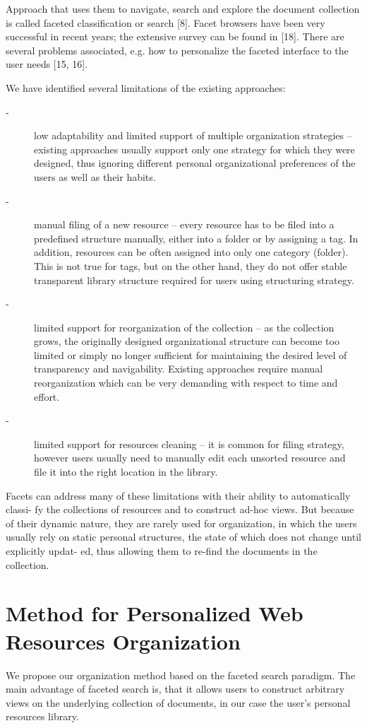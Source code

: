 \documentclass{llncs}
\begin{document}
Approach that uses them to navigate, search and explore the document collection is called faceted classification or search [8]. Facet browsers have been very successful in recent years; the extensive survey can be found in [18]. There are several problems associated, e.g. how to personalize the faceted interface to the user needs [15, 16].

We have identified several limitations of the existing approaches:
\begin{description}
\item [-] low adaptability and limited support of multiple organization strategies – existing approaches usually support only one strategy for which they were designed, thus ignoring different personal organizational preferences of the users as well as their habits.
\item [-] manual filing of a new resource – every resource has to be filed into a predefined structure manually, either into a folder or by assigning a tag. In addition, resources can be often assigned into only one category (folder). This is not true for tags, but on the other hand, they do not offer stable transparent library structure required for users using structuring strategy.
	
\item [-] limited support for reorganization of the collection – as the collection grows, the originally designed organizational structure can become too limited or simply no longer sufficient for maintaining the desired level of transparency and navigability. Existing approaches require manual reorganization which can be very demanding with respect to time and effort.
	
\item [-] limited support for resources cleaning – it is common for filing strategy, however users usually need to manually edit each unsorted resource and file it into the right location in the library.
	
\end{description}

Facets can address many of these limitations with their ability to automatically classi- fy the collections of resources and to construct ad-hoc views. But because of their dynamic nature, they are rarely used for organization, in which the users usually rely on static personal structures, the state of which does not change until explicitly updat- ed, thus allowing them to re-find the documents in the collection.

\section{Method for Personalized Web Resources Organization}
We propose our organization method based on the faceted search paradigm. The main advantage of faceted search is, that it allows users to construct arbitrary views on the underlying collection of documents, in our case the user’s personal resources library.
\end{document}
